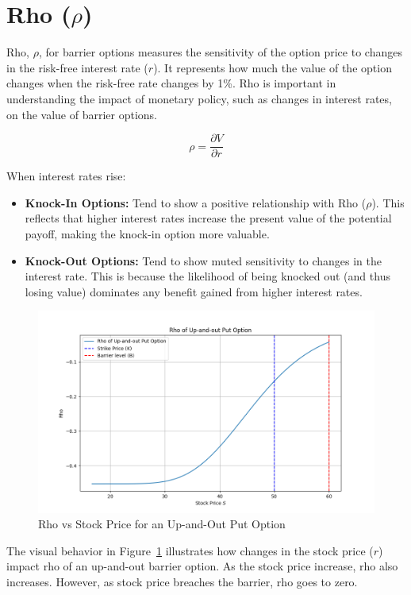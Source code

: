 \section{Rho (\(\rho\))}

Rho, $\rho$, for barrier options measures the sensitivity of the option price to changes in the risk-free interest rate (\(r\)). It represents how much the value of the option changes when the risk-free rate changes by 1\%. Rho is important in understanding the impact of monetary policy, such as changes in interest rates, on the value of barrier options.

\[
\rho = \frac{\partial V}{\partial r}
\]

When interest rates rise:
\begin{itemize}
	\item \textbf{Knock-In Options:} Tend to show a positive relationship with Rho (\(\rho\)). This reflects that higher interest rates increase the present value of the potential payoff, making the knock-in option more valuable.
	\item \textbf{Knock-Out Options:} Tend to show muted sensitivity to changes in the interest rate. This is because the likelihood of being knocked out (and thus losing value) dominates any benefit gained from higher interest rates.
\end{itemize}
\begin{figure}[H]
    \centering
    \includegraphics[width=.65\linewidth]{content/images/rho.png}
    \caption{Rho vs Stock Price for an Up-and-Out Put Option}
    \label{fig:rho_behavior}
\end{figure}

The visual behavior in Figure~\ref{fig:rho_behavior} illustrates how changes in the stock price (\(r\)) impact rho of an up-and-out barrier option. As the stock price increase, rho also increases. However, as stock price breaches the barrier, rho goes to zero.